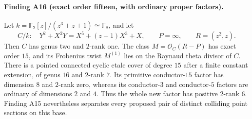\documentclass[11pt,a4paper]{article}
\begin{document}
\paragraph{Finding A16 (exact order fifteen, with ordinary proper factors).}
Let $k=\mathbb F_2[z]/(z^3+z+1)\simeq\mathbb F_8$, and let
\[
 C/k:\quad Y^2+X^2Y=X^5+(z+1)X^3+X,\qquad
 P=\infty,\qquad R=(z^2,z).
 \tag{CE.1}
\]
Then $C$ has genus two and $2$-rank one. The class
$M=\mathcal O_C(R-P)$ has exact order $15$, and its Frobenius twist
$M^{(1)}$ lies on the Raynaud theta divisor of $C$.
There is a pointed connected cyclic etale cover of degree $15$
after a finite constant extension, of genus $16$ and $2$-rank $7$.
Its primitive conductor-$15$ factor has dimension $8$ and $2$-rank
zero, whereas its conductor-$3$ and conductor-$5$ factors are
ordinary of dimensions $2$ and $4$. Thus the whole new factor has
positive $2$-rank $6$. Finding A15 nevertheless separates every
proposed pair of distinct colliding point sections on this base.
\end{document}
